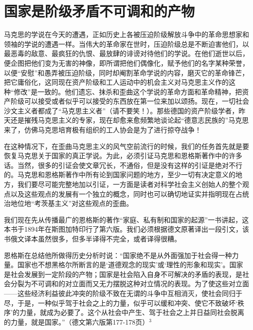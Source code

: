 \chapter{国家是阶级矛盾不可调和的产物} %


马克思的学说在今天的遭遇，正如历史上各被压迫阶级解放斗争中的革命思想家和领袖的学说的遭遇一样。当伟大的革命家在世时，压迫阶级总是不断迫害他们，以最恶毒的敌意、最疯狂的仇恨、最放肆的诽谤对待他们的学说。在他们逝世以后，便企图把他们变为无害的神像，即所谓把他们偶像化，赋予他们的{\kaishu 名字}某种荣誉，以便“安慰”和愚弄被压迫阶级，同时却阉割革命学说的内容，磨灭它的革命锋芒，把它庸俗化，这同现在资产阶级和工人运动中的机会主义对马克思主义作的这种“修改”是一致的。他们遗忘、抹杀和歪曲这个学说的革命方面和革命精神，把资产阶级可以接受或者似乎可以接受的东西放在第一位来加以颂扬。现在，一切社会沙文主义者都成了“马克思主义者”（请不要笑！）。那些德国的资产阶级学者，昨天还是摧残马克思主义的专家，现在却愈来愈频繁地谈论起“德意志民族的”马克思来了，仿佛马克思培育极有组织的工人协会是为了进行掠夺战争！

在这种情况下，在歪曲马克思主义的风气空前流行的时候，我们的任务首先就是要{\kaishu 恢复}马克思关于国家的真正学说。为此，必须引证马克思和恩格斯著作中的许多话。当然，很多的引证会使文章冗长，不通俗，但是没有这样的引证是绝对不行的。马克思和恩格斯著作中所有论到国家问题的地方，至少一切有决定意义的地方，我们要尽可能完整地加以引证，一方面是读者对科学社会主义创始人的整个观点以及这些观点的发展有一个独立的概念，同时也可以确切地证实并指明现在占统治地位地“考茨基主义”对这些观点的歪曲。

我们现在先从传播最广的恩格斯的著作“家庭、私有制和国家的起源”一书讲起，这本书于1894年在斯图加特印行了第六版。我们必须根据德文原著译出一段引文，该书俄文译本虽然很多，但多半译得不完全，或者译得很糟。

\pskip
\leftskip=10mm
\small
恩格斯在总结他所做得历史分析时说：“国家绝不是从外面强加于社会得一种力量。国家也不想黑格尔所断言的是‘道德观念的现实’或‘理性的形象和现实’。国家是社会发展到一定阶段的产物；国家是社会陷入自身不可解决的矛盾的表现，是社会分裂为不可调和的对立面而又无力摆脱这种对立情况的表现。为了使这些对立面——这些经济利益彼此冲突的阶级不致在无谓的斗争中互相消灭，使社会同归于尽，于是，一种似乎驾于社会之上的力量，似乎可以缓和冲突、使它不致破坏‘秩序’的力量，就成为必要了。这个从社会中产生、驾于社会之上并日益同社会脱离的力量，就是国家。”（德文第六版第177-178页）$^{3}$

